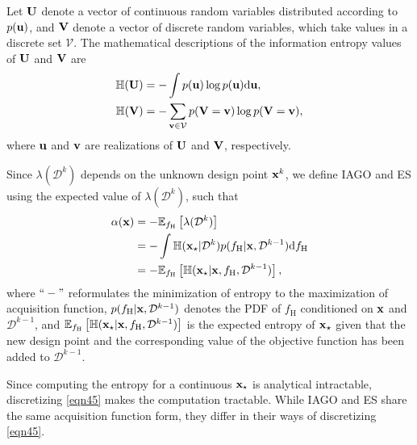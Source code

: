 \documentclass[iicol,sn-basic]{sn-jnl}%
\begin{document}
Let ${\bf U}$ denote a vector of continuous random variables distributed according to $p({\bf u})$, and ${\bf V}$ denote a vector of discrete random variables, which take values in a discrete set $\mathcal{V}$.
The mathematical descriptions of the information entropy values of ${\bf U}$ and ${\bf V}$ are 
\begin{subequations}\label{eqn44}
	\begin{align}
		\mathbb{H}({\bf U})& =-\int p({\bf u}) \log{p({\bf u})} \text{d}{\bf u}
		\label{eqn44-1},\\
		\mathbb{H}({\bf V}) & = -\sum_{{\bf v} \in \mathcal{V}}p({\bf V}={\bf v}) \log{p({\bf V}={\bf v})}
		\label{eqn44-2},
	\end{align}
\end{subequations}
where ${\bf u}$ and ${\bf v}$ are realizations of ${\bf U}$ and ${\bf V}$, respectively.

Since $\lambda(\mathcal{D}^{k})$ depends on the unknown design point ${\bf x}^k$, we define IAGO and ES using the expected value of $\lambda(\mathcal{D}^{k})$, such that
\begin{equation}\label{eqn45}
	\begin{aligned}
		\alpha({\bf x}) & = -\mathbb{E}_{f_\text{H}}\left[\lambda(\mathcal{D}^{k})\right]\\
		& = -\int \mathbb{H}({\bf x}_\star|\mathcal{D}^{k})  p(f_\text{H}|{\bf x},\mathcal{D}^{k-1}) \text{d}f_\text{H}\\
		& = -\mathbb{E}_{f_\text{H}}\left[\mathbb{H}({\bf x}_\star|{\bf x},f_\text{H},\mathcal{D}^{k-1})\right],
	\end{aligned}
\end{equation}
where $``-"$ reformulates the minimization of entropy to the maximization of acquisition function, $p(f_\text{H}|{\bf x},\mathcal{D}^{k-1})$ denotes the PDF of $f_\text{H}$ conditioned on $\bf x$ and $\mathcal{D}^{k-1}$, and $\mathbb{E}_{f_\text{H}}\left[\mathbb{H}({\bf x}_\star|{\bf x},f_\text{H},\mathcal{D}^{k-1})\right]$ is the expected entropy of ${\bf x}_\star$ given that the new design point and the corresponding value of the objective function has been added to $\mathcal{D}^{k-1}$.

Since computing the entropy for a continuous ${\bf x}_\star$ is analytical intractable, discretizing \cref{eqn45} makes the computation tractable.
While IAGO and ES share the same acquisition function form, they differ in their ways of discretizing \cref{eqn45}.
\end{document}
